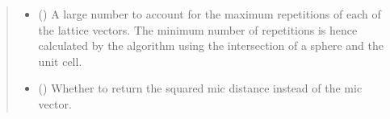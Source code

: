 \documentclass[letterpaper,10pt,english]{sphinxmanual}
\begin{document}
\begin{fulllineitems}
\begin{quote}
\begin{description}
\begin{itemize}
\item {} 
 (\sphinxstyleliteralemphasis{\sphinxupquote{, }}) \textendash{} A large number to account for the maximum repetitions of each
of the lattice vectors. The minimum number of repetitions is
hence calculated by the algorithm using the intersection of a
sphere and the unit cell.

\item {} 
 (\sphinxstyleliteralemphasis{\sphinxupquote{, }}) \textendash{} Whether to return the squared mic distance instead of the
mic vector.

\end{itemize}

\end{description}\end{quote}

\end{fulllineitems}

\end{document}

